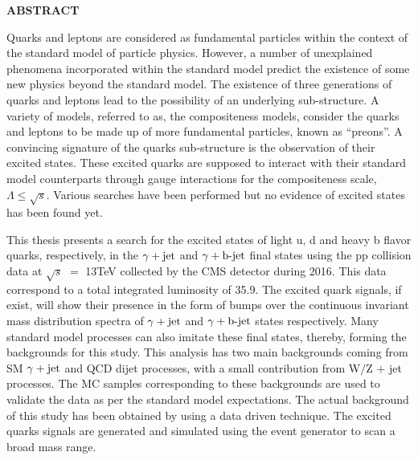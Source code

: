\documentclass[12pt,a4]{article}
\begin{document}
\thispagestyle{empty}

\begin{center}
  \clearpage
  \vspace{5mm}
  \noindent\uppercase{\Large \textbf{Abstract}}
  \vspace{1cm}
\end{center}
Quarks and leptons are considered as fundamental particles within the context of the standard model of particle physics. However, a number of unexplained phenomena
incorporated within the standard model predict the existence of some new physics beyond the standard model. The existence of three generations of quarks and
leptons lead to the
possibility of an underlying sub-structure. A variety of models, referred to as, the compositeness models, consider the quarks and leptons to be made up of
more fundamental particles, known as ``preons''. A convincing signature of the quarks sub-structure is the observation of their excited states.
These excited quarks are supposed to interact with their standard model counterparts through gauge interactions for the compositeness scale, $\Lambda\le\sqrt{s}$.
Various searches have been performed but no evidence of excited states has been found yet. 

This thesis presents a search for the excited states of light u, d and heavy b flavor quarks, respectively, in the $\gamma+\mathrm{jet}$ and $\gamma+\mathrm{b}\textrm{-}\mathrm{jet}$ final states using the
pp collision data at $\sqrt{s}$ $=$ 13\unit{TeV} collected by the CMS detector during 2016. This data correspond to a total integrated luminosity of
35.9\unit{\fbinv}. The excited quark signals, if exist, will show their presence in the form of bumps over the continuous invariant mass distribution spectra 
of $\gamma+\mathrm{jet}$ and $\gamma+\mathrm{b}\textrm{-}\mathrm{jet}$ states respectively. Many standard model processes can also imitate these final states, thereby, forming
the backgrounds for this study. This analysis has two main backgrounds coming from SM $\gamma+\mathrm{jet}$ and QCD dijet processes, with a small contribution from W$/$Z $+$ jet
processes. The MC samples corresponding to these backgrounds are used to validate the data as per the standard model expectations.
The actual background of this study has been obtained by using a data driven technique. The excited quarks signals are generated and simulated using
the event generator \pythia to scan a broad mass range.
\end{document}
